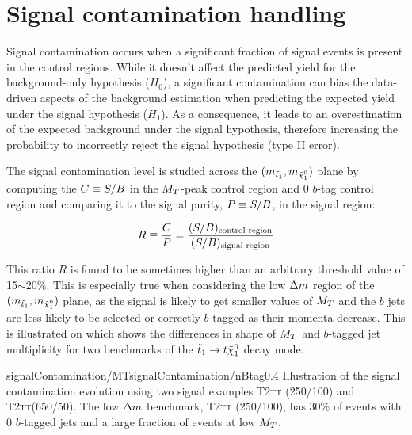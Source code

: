     \section{Signal contamination handling \label{sec:signalContamination}}

    Signal contamination occurs when a significant fraction of signal events is present in
    the control regions. While it doesn't affect the predicted yield for the background-only hypothesis
    ($H_0$), a significant contamination can bias the data-driven aspects of the background
    estimation when predicting the expected yield under the signal hypothesis ($H_1$). As a
    consequence, it leads to an overestimation of the expected background under the signal hypothesis,
    therefore increasing the probability to incorrectly reject the signal hypothesis (type II error).

    The signal contamination level is studied across the $(m_{\tilde{t}_1},m_{\tilde{\chi}_1^0})$
    plane by computing the $C \equiv S/B$ in the $M_T$-peak control region and 0 $b$-tag
    control region and comparing it to the signal purity, $P \equiv S/B$, in the signal region:

    \begin{equation}
        R \equiv \frac{C}{P} = \frac{(S/B)_\text{control region}}{(S/B)_\text{signal region}}
        \label{eq:contaminationRatio}
    \end{equation}

    This ratio $R$ is found to be sometimes higher than an arbitrary threshold value of 15$\sim$20\%.
    This is especially true when considering the low $\Delta m$ region of the $(m_{\tilde{t}_1},
    m_{\tilde{\chi}_1^0})$ plane, as the signal is likely to get smaller values of $M_T$ and the $b$ jets
    are less likely to be selected or correctly $b$-tagged as their momenta decrease. This is illustrated
    on  which shows the differences in shape of $M_T$ and
    $b$-tagged jet multiplicity for two benchmarks of the $\tilde{t}_1 \rightarrow t \tilde{\chi}_1^0$ decay mode.

                     {signalContamination/MT}{signalContamination/nBtag}{0.4}
                     {Illustration of the signal contamination evolution using two signal examples
                     \textsc{T2tt} (250/100) and \textsc{T2tt}(650/50). The low $\Delta m$ benchmark, \textsc{T2tt} (250/100),
                     has 30\% of events with 0 $b$-tagged jets and a large fraction of events at low $M_T$.}

